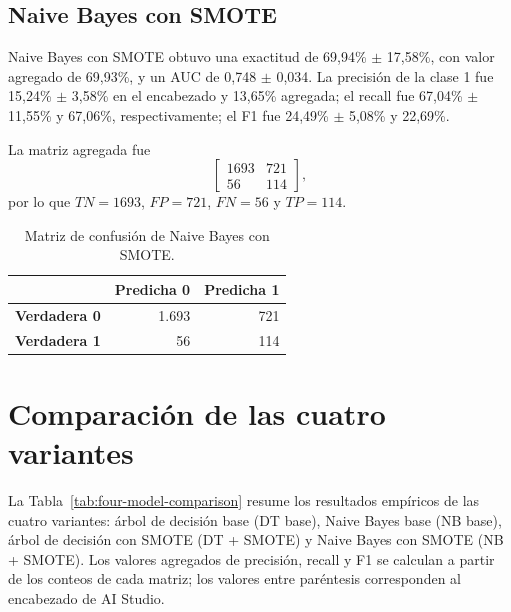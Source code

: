 \documentclass[12pt,a4paper]{article}
\begin{document}
\subsection{Naive Bayes con SMOTE}

Naive Bayes con SMOTE obtuvo una exactitud de 69,94\% $\pm$ 17,58\%, con valor agregado de 69,93\%, y un AUC de 0,748 $\pm$ 0,034. La precisión de la clase 1 fue 15,24\% $\pm$ 3,58\% en el encabezado y 13,65\% agregada; el recall fue 67,04\% $\pm$ 11,55\% y 67,06\%, respectivamente; el F1 fue 24,49\% $\pm$ 5,08\% y 22,69\%.

La matriz agregada fue
\[
\begin{bmatrix}
1693 & 721 \\
56 & 114
\end{bmatrix},
\]
por lo que $TN=1693$, $FP=721$, $FN=56$ y $TP=114$.

\begin{table}[H]
    \centering
    \caption{Matriz de confusión de Naive Bayes con SMOTE.}
    \label{tab:nb-smote-matrix}
    \begin{tabular}{lrr}
        \toprule
        & \textbf{Predicha 0} & \textbf{Predicha 1} \\
        \midrule
        \textbf{Verdadera 0} & 1.693 & 721 \\
        \textbf{Verdadera 1} & 56 & 114 \\
        \bottomrule
    \end{tabular}
\end{table}

\section{Comparación de las cuatro variantes}

La Tabla~\ref{tab:four-model-comparison} resume los resultados empíricos de las cuatro variantes: árbol de decisión base (DT base), Naive Bayes base (NB base), árbol de decisión con SMOTE (DT + SMOTE) y Naive Bayes con SMOTE (NB + SMOTE). Los valores agregados de precisión, recall y F1 se calculan a partir de los conteos de cada matriz; los valores entre paréntesis corresponden al encabezado de AI Studio.
\end{document}
